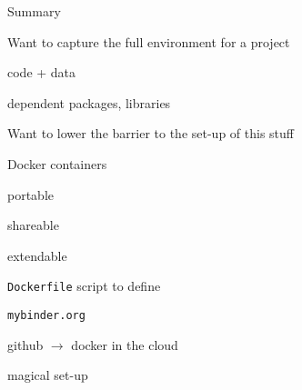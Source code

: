 \documentclass[aspectratio=169,12pt,t]{beamer}
\begin{document}
\begin{frame}{Summary}

  \bbi
\item Want to capture the full environment for a project
  \bi
\item code + data
\item dependent packages, libraries
  \ei
\item Want to lower the barrier to the set-up of this stuff
\item Docker containers
  \bi
\item portable
\item shareable
\item extendable
\item {\tt Dockerfile} script to define
  \ei
\item {\tt mybinder.org}
  \bi
\item github $\rightarrow$ docker in the cloud
\item magical set-up
  \ei
  \ei

\end{frame}
\end{document}
